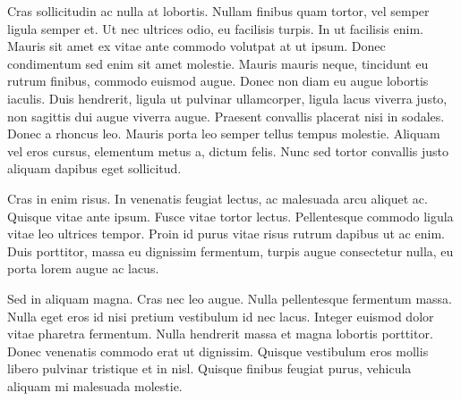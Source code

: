 \documentclass{book}
\begin{document}
Cras sollicitudin ac nulla at lobortis. Nullam finibus quam tortor, vel semper
ligula semper et. Ut nec ultrices odio, eu facilisis turpis. In ut facilisis
enim. Mauris sit amet ex vitae ante commodo volutpat at ut ipsum. Donec
condimentum sed enim sit amet molestie. Mauris mauris neque, tincidunt eu rutrum
finibus, commodo euismod augue. Donec non diam eu augue lobortis iaculis. Duis
hendrerit, ligula ut pulvinar ullamcorper, ligula lacus viverra justo, non
sagittis dui augue viverra augue. Praesent convallis placerat nisi in
sodales. Donec a rhoncus leo. Mauris porta leo semper tellus tempus
molestie. Aliquam vel eros cursus, elementum metus a, dictum felis. Nunc sed
tortor convallis justo aliquam dapibus eget sollicitud.


Cras in enim risus. In venenatis feugiat lectus, ac malesuada arcu aliquet
ac. Quisque vitae ante ipsum. Fusce vitae tortor lectus. Pellentesque commodo
ligula vitae leo ultrices tempor. Proin id purus vitae risus rutrum dapibus ut
ac enim. Duis porttitor, massa eu dignissim fermentum, turpis augue consectetur
nulla, eu porta lorem augue ac lacus.

Sed in aliquam magna. Cras nec leo augue. Nulla pellentesque fermentum
massa. Nulla eget eros id nisi pretium vestibulum id nec lacus. Integer euismod
dolor vitae pharetra fermentum. Nulla hendrerit massa et magna lobortis
porttitor. Donec venenatis commodo erat ut dignissim. Quisque vestibulum eros
mollis libero pulvinar tristique et in nisl. Quisque finibus feugiat purus,
vehicula aliquam mi malesuada molestie.
\end{document}
